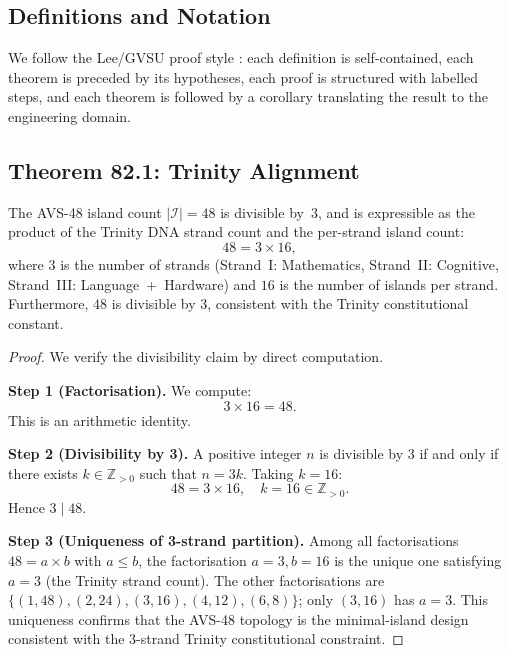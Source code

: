 \subsection{Definitions and Notation}

We follow the Lee/GVSU proof style \cite{lee_intro_topology}: each
definition is self-contained, each theorem is preceded by its hypotheses,
each proof is structured with labelled steps, and each theorem is
followed by a corollary translating the result to the engineering domain.

\subsection{Theorem 82.1: Trinity Alignment}

\begin{theorem}
\label{thm:trinity_alignment}
The AVS-48 island count $|\mathcal{I}| = 48$ is divisible by~3, and
is expressible as the product of the Trinity DNA strand count and the
per-strand island count:
\[
  48 = 3 \times 16,
\]
where $3$ is the number of strands (Strand~I: Mathematics, Strand~II:
Cognitive, Strand~III: Language~+~Hardware) and $16$ is the number of
islands per strand.  Furthermore, $48$ is divisible by $3$, consistent
with the Trinity constitutional constant.
\end{theorem}

\begin{proof}
We verify the divisibility claim by direct computation.

\medskip
\noindent\textbf{Step 1 (Factorisation).}
We compute:
\[
  3 \times 16 = 48.
\]
This is an arithmetic identity.

\medskip
\noindent\textbf{Step 2 (Divisibility by 3).}
A positive integer $n$ is divisible by 3 if and only if there exists
$k \in \mathbb{Z}_{>0}$ such that $n = 3k$.  Taking $k = 16$:
\[
  48 = 3 \times 16, \quad k = 16 \in \mathbb{Z}_{>0}.
\]
Hence $3 \mid 48$.

\medskip
\noindent\textbf{Step 3 (Uniqueness of 3-strand partition).}
Among all factorisations $48 = a \times b$ with $a \leq b$, the
factorisation $a = 3, b = 16$ is the unique one satisfying $a = 3$
(the Trinity strand count).  The other factorisations are
$\{(1,48), (2,24), (3,16), (4,12), (6,8)\}$; only $(3, 16)$ has $a = 3$.
This uniqueness confirms that the AVS-48 topology is the minimal-island
design consistent with the 3-strand Trinity constitutional constraint.
\end{proof}

